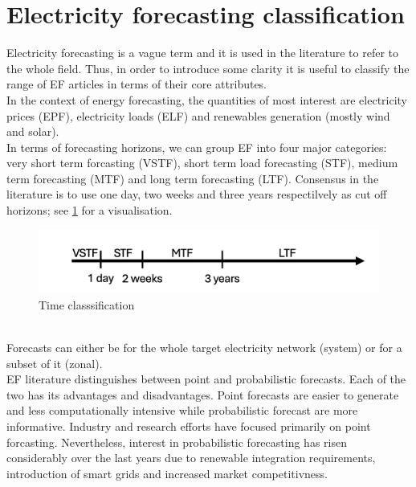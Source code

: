 \section{Electricity forecasting classification}
Electricity forecasting is a vague term and it is used in the literature to refer to the whole field. Thus, in order to introduce some clarity it is useful to classify the range of EF articles in terms of their core attributes.
\\
In the context of energy forecasting, the quantities of most interest are electricity prices (EPF), electricity loads (ELF) and renewables generation (mostly wind and solar).
\\
In terms of forecasting horizons, we can group EF into four major categories: very short term forcasting (VSTF), short term load forecasting (STF), medium term forecasting (MTF) and long term forecasting (LTF). Consensus in the literature is to use one day, two weeks and three years respectilvely \cite{hong_phd} as cut off horizons; see \ref{fig:time} for a visualisation. 
\begin{figure}
  \includegraphics[width=\textwidth]{images/time_2.png}
  \caption{Time classsification \cite{prob_elf}}
  \label{fig:time}
\end{figure}
\\
Forecasts can either be for the whole target electricity network (system) or for a subset of it (zonal).
\\
EF literature distinguishes between point and probabilistic forecasts. Each of the two has its advantages and disadvantages. Point forecasts are easier to generate and less computationally intensive while probabilistic forecast are more informative. Industry and research efforts have focused primarily on point forcasting. Nevertheless, interest in probabilistic forecasting has risen considerably over the last years due to renewable integration requirements, introduction of smart grids and increased market competitivness.
